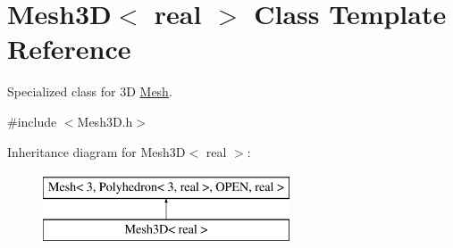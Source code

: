 \hypertarget{class_mesh3_d}{}\section{Mesh3D$<$ real $>$ Class Template Reference}
\label{class_mesh3_d}


Specialized class for 3D \hyperlink{class_mesh}{Mesh}.  




{\ttfamily \#include $<$Mesh3\+D.\+h$>$}

Inheritance diagram for Mesh3D$<$ real $>$\+:\begin{figure}[H]
\begin{center}
\leavevmode
\includegraphics[height=2.000000cm]{class_mesh3_d}
\end{center}
\end{figure}

